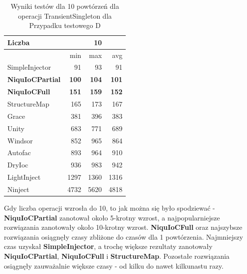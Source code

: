 \documentclass[12pt]{article}
\begin{document}
\begin{table}[H]
\captionsetup{belowskip=0pt,aboveskip=0pt}
\begin{center}
\begin{small}
	\begin{tabular}{ | l | r r r | }
    		\hline
Liczba & & 10 & \\ \hline
 & min & max & avg \\ \hline
SimpleInjector & 91 & 93 & 91 \\ \hline
\textbf{NiquIoCPartial} & \textbf{100} & \textbf{104} & \textbf{101} \\ \hline
\textbf{NiquIoCFull} & \textbf{151} & \textbf{159} & \textbf{152} \\ \hline
StructureMap & 165 & 173 & 167 \\ \hline
Grace & 381 & 396 & 383 \\ \hline
Unity & 683 & 771 & 689 \\ \hline
Windsor & 852 & 965 & 864 \\ \hline
Autofac & 893 & 964 & 910 \\ \hline
DryIoc & 936 & 983 & 942 \\ \hline
LightInject & 1297 & 1360 & 1316 \\ \hline
Ninject & 4732 & 5620 & 4818 \\ \hline
  	\end{tabular}
\end{small}
\end{center}
\caption{Wyniki testów dla 10 powtórzeń dla operacji TransientSingleton dla Przypadku testowego D}
\label{TestCaseD_TransientSingleton10}
\end{table}
Gdy liczba operacji wzrosła do 10, to jak można się było spodziewać - \textbf{NiquIoCPartial} zanotował około 5-krotny wzrost, a najpopularniejsze rozwiązania zanotowały około 10-krotny wzrost. \textbf{NiquIoCFull} oraz najszybsze rozwiązania osiągnęły czasy zbliżone do czasów dla 1 powtórzenia. Najmniejszy czas uzyskał \textbf{SimpleInjector}, a trochę większe rezultaty zanotowały \textbf{NiquIoCPartial}, \textbf{NiquIoCFull} i \textbf{StructureMap}. Pozostałe rozwiązania osiągnęły zauważalnie większe czasy - od kilku do nawet kilkunastu razy.
\end{document}
